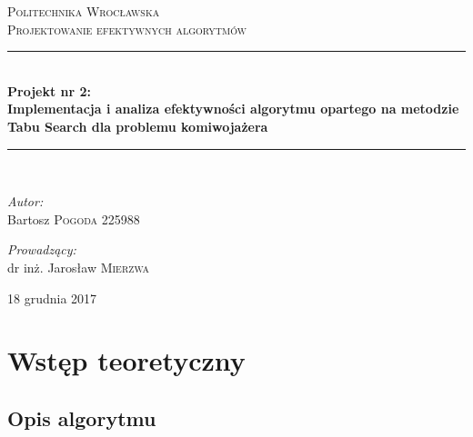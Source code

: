 \documentclass[a4paper,11pt]{article}
\begin{document}
\begin{titlepage}


\newcommand{\HRule}{\rule{\linewidth}{0.5mm}}
\center

\textsc{\LARGE Politechnika Wrocławska}\\[1.5cm]
\textsc{\LARGE Projektowanie efektywnych algorytmów}\\[0.5cm]

\HRule \\[0.5cm]
{ \huge \bfseries Projekt nr 2: \\[0.3cm]Implementacja i analiza efektywności algorytmu opartego na metodzie Tabu Search dla problemu komiwojażera }\\[0.5cm] 
\HRule \\[1.5cm]

\begin{flushleft} \large
 
\emph{Autor:}\\
 
Bartosz  \textsc{Pogoda} 225988 \\
 
\end{flushleft}
 
\begin{flushright} \large
 
\emph{Prowadzący:} \\
dr inż. Jarosław \textsc{Mierzwa} 
 
\end{flushright}
 
\vfill
{\large 18 grudnia 2017}\\[3cm] 
 
 
\end{titlepage}

\tableofcontents
\newpage

\section{Wstęp teoretyczny}

\subsection{Opis algorytmu}
\end{document}
